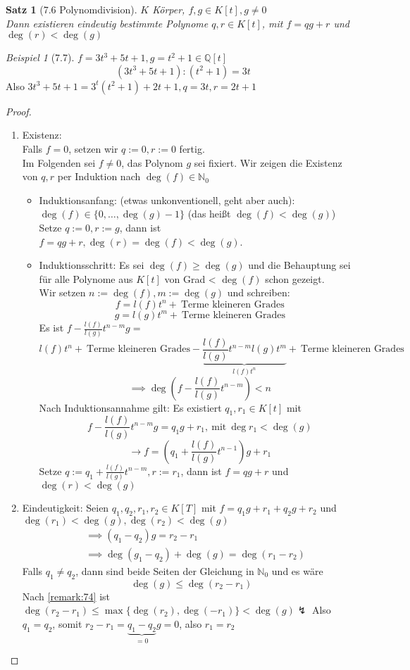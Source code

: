 \documentclass[a4paper]{scrartcl}
\theoremstyle{definition}
\theoremstyle{plain}
\newtheorem{thm}{Satz}
\theoremstyle{plain}
\theoremstyle{remark}
\theoremstyle{remark}
\theoremstyle{remark}
\theoremstyle{remark}
\theoremstyle{remark}
\newtheorem{ex}{Beispiel}
\begin{document}
\begin{thm}[7.6 Polynomdivision]
\label{thm:poly_div}
$K$ Körper, $f,g\in K[t], g\neq 0$ \\
  Dann existieren eindeutig bestimmte Polynome $q,r \in K[t]$, mit $f = q g + r$ und $\deg(r) < \deg(g)$
\end{thm}

\begin{ex}[7.7]
$f = 3 t^3 + 5 t + 1, g = t^2 + 1 \in\mathbb{Q}[t]$
\[(3 t^3 + 5 t + 1) : (t ^2 + 1) = 3 t\]
Also $3 t^3 + 5t + 1 = 3^t (t^2 + 1) + 2 t + 1, q = 3 t, r = 2 t + 1$
\end{ex}

\begin{proof}
\begin{enumerate}
\item Existenz: \\
     Falls $f = 0$, setzen wir $q := 0, r:= 0$ fertig. \\
     Im Folgenden sei $f\neq 0$, das Polynom $g$ sei fixiert. Wir zeigen die Existenz von $q,r$ per Induktion nach $\deg(f) \in\mathbb{N}_0$ \\
\begin{itemize}
\item Induktionsanfang: (etwas unkonventionell, geht aber auch): $\deg(f) \in \{0,\ldots,\deg(g) - 1\}$ (das heißt $\deg(f) < \deg(g)$) \\
       Setze $q:= 0, r:= g$, dann ist $f = q g + r, \deg(r) = \deg(f) < \deg(g)$.
\item Induktionsschritt: Es sei $\deg(f) \geq \deg(g)$ und die Behauptung sei für alle Polynome aus $K[t]$ von Grad < $\deg(f)$ schon gezeigt. \\
       Wir setzen $n:= \deg(f), m:=\deg(g)$ und schreiben:
\[f = l(f)t^n + ~\text{Terme kleineren Grades}\]
\[g = l(g) t^m + ~\text{Terme kleineren Grades}\]
Es ist $f - \frac{l(f)}{l(g)}t^{n - m}g =$
\[l(f) t^n + ~\text{Terme kleineren Grades} - \underbrace{\frac{l(f)}{l(g)} t^{n - m}l(g) t^m}_{l(f)t^n} + ~\text{Terme kleineren Grades}\]
\[\implies \deg(f - \frac{l(f)}{l(g)}t^{n - m}) < n\]
Nach Induktionsannahme gilt: Es existiert $q_1,r_1 \in K[t]$ mit
\[f - \frac{l(f)}{l(g)}t^{n -m}g = q_1 g + r_1, ~\text{mit}~\deg{r_1} < \deg(g)\]
\[\rightarrow f = (q_1 + \frac{l(f)}{l(g)} t^{n - 1})g + r_1\]
Setze $q:= q_1 + \frac{l(f)}{l(g)}t^{n - m}, r:= r_1$, dann ist $f = q g + r$ und $\deg(r) < \deg(g)$
\end{itemize}
\item Eindeutigkeit: Seien $q_1,q_2,r_1,r_2\in K[T]$ mit $f = q_1 g + r_1 + q_2 g + r_2$ und $\deg(r_1) < \deg(g), \deg(r_2) < \deg(g)$
\begin{align*}
&\implies (q_1 - q_2) g = r_2 - r_1 \\
&\implies \deg(g_1 - q_2) + \deg(g) = \deg(r_1 - r_2)
\end{align*}
Falls $q_1 \neq q_2$, dann sind beide Seiten der Gleichung in $\mathbb{N}_0$ und es wäre
\[\deg(g) \leq \deg(r_2 - r_1)\]
Nach \ref{remark:74} ist $\deg(r_2 - r_1) \leq \max\{\deg(r_2),\deg(-r_1)\} < \deg(g) \lightning$
Also $q_1 = q_2$, somit $r_2 - r_1 = \underbrace{q_1 - q_2}_{= 0} g = 0$, also $r_1 = r_2$
\end{enumerate}
\end{proof}
\end{document}
